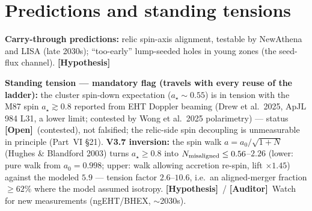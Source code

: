 \documentclass[11pt]{article}
\newcommand{\Auditor}{\textbf{\textcolor{teal!55!black}{[Auditor]}}}
\newcommand{\hyp}{\textcolor{orange!80!black}{\textbf{[Hypothesis]}}}
\newcommand{\open}{\textcolor{red!70!black}{\textbf{[Open]}}}
\begin{document}
\section{Predictions and standing tensions}
\textbf{Carry-through predictions:} relic spin-axis alignment, testable by NewAthena and LISA (late 2030s); ``too-early'' lump-seeded holes in young zones (the seed-flux channel). \hyp

\textbf{Standing tension --- mandatory flag (travels with every reuse of the ladder):} the cluster spin-down expectation ($a_\star\sim0.55$) is in tension with the M87 spin $a_\star\gtrsim0.8$ reported from EHT Doppler beaming (Drew et al.\ 2025, ApJL 984 L31, a lower limit; contested by Wong et al.\ 2025 polarimetry) --- status \open\ (contested), not falsified; the relic-side spin decoupling is unmeasurable in principle (Part~VI \S21). \textbf{V3.7 inversion:} the spin walk $a=a_0/\sqrt{1+N}$ (Hughes \& Blandford 2003) turns $a_\star\ge0.8$ into $N_{\rm misaligned}\le0.56$--$2.26$ (lower: pure walk from $a_0=0.998$; upper: walk allowing accretion re-spin, lift $\times1.45$) against the modeled $5.9$ --- tension factor $2.6$--$10.6$, i.e.\ an aligned-merger fraction $\ge62\%$ where the model assumed isotropy. \hyp\ / \Auditor\ Watch for new measurements (ngEHT/BHEX, $\sim$2030s).

\end{document}
